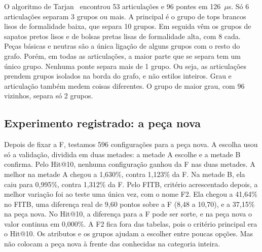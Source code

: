 O algoritmo de Tarjan~\cite{tarjan1972,hopcroft1973} encontrou 53 articulações e 96 pontes em 126~$\mu$s. Só 6 articulações separam 3 grupos ou mais. A principal é o grupo de tops brancos lisos de formalidade baixa, que separa 10 grupos. Em seguida vêm os grupos de sapatos pretos lisos e de bolsas pretas lisas de formalidade alta, com 8 cada. Peças básicas e neutras são a única ligação de alguns grupos com o resto do grafo. Porém, em todas as articulações, a maior parte que se separa tem um único grupo. Nenhuma ponte separa mais de 1 grupo. Ou seja, as articulações prendem grupos isolados na borda do grafo, e não estilos inteiros. Grau e articulação também medem coisas diferentes. O grupo de maior grau, com 96 vizinhos, separa só 2 grupos.

\subsection{Experimento registrado: a peça nova}

Depois de fixar a F, testamos 596 configurações para a peça nova. A escolha usou só a validação, dividida em duas metades: a metade A escolhe e a metade B confirma. Pelo Hit@10, nenhuma configuração ganhou da F nas duas metades. A melhor na metade A chegou a 1,630\%, contra 1,123\% da F. Na metade B, ela caiu para 0,995\%, contra 1,312\% da F. Pelo FITB, critério acrescentado depois, a melhor variação foi ao teste uma única vez, com o nome F2. Ela chegou a 41,64\% no FITB, uma diferença real de 9,60 pontos sobre a F (8,48 a 10,70), e a 37,15\% na peça nova. No Hit@10, a diferença para a F pode ser sorte, e na peça nova o valor continua em 0,000\%. A F2 fica fora das tabelas, pois o critério principal era o Hit@10. Os atributos e os grupos ajudam a escolher entre poucas opções. Mas não colocam a peça nova à frente das conhecidas na categoria inteira.
